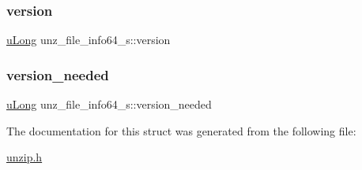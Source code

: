 \mbox{\label{structunz__file__info64__s_a4262e51be02716b887447e68c231006b}} 
\subsubsection{\texorpdfstring{version}{version}}
{\footnotesize\ttfamily \hyperlink{ioapi_8h_a50e9e9d5c30e481de822ad68fe537986}{u\+Long} unz\+\_\+file\+\_\+info64\+\_\+s\+::version}

\mbox{\label{structunz__file__info64__s_ad0041eacba37cb431242d9bd9c86d264}} 
\subsubsection{\texorpdfstring{version\+\_\+needed}{version\_needed}}
{\footnotesize\ttfamily \hyperlink{ioapi_8h_a50e9e9d5c30e481de822ad68fe537986}{u\+Long} unz\+\_\+file\+\_\+info64\+\_\+s\+::version\+\_\+needed}



The documentation for this struct was generated from the following file\+:\begin{DoxyCompactItemize}
\item 
\hyperlink{unzip_8h}{unzip.\+h}\end{DoxyCompactItemize}
